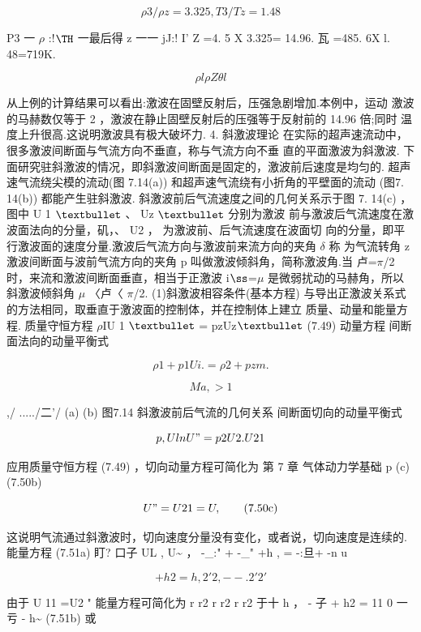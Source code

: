 \[\rho 3/\rho  z=3.325 ,  T3 /Tz = 1. 48\]

P3 一 $\rho$ :!${\rm Þ}$ 一最后得 z 一一 jJ:! I' Z =4. 5 X 3.325= 14.96. 瓦 =485. 6X l. 48=719K.

\[\rho l\rho Z \theta l\]

从上例的计算结果可以看出:激波在固壁反射后，压强急剧增加.本例中，运动 激波的马赫数仅等于 2 ，激波在静止固壁反射后的压强等于反射前的 14.96 倍;同时 温度上升很高.这说明激波具有极大破坏力. 4. 斜激波理论 在实际的超声速流动中，很多激波间断面与气流方向不垂直，称与气流方向不垂 直的平面激波为斜激波. 下面研究驻斜激波的情况，即斜激波间断面是固定的，激波前后速度是均匀的. 超声速气流绕尖模的流动(图 7.14(a)) 和超声速气流绕有小折角的平壁面的流动 (图7. 14(b)) 都能产生驻斜激波. 斜激波前后气流速度之间的几何关系示于图 7. 14(c) ，图中 U 1 ${\rm •}$ 、 Uz ${\rm •}$ 分别为激波 前与激波后气流速度在激波面法向的分量，矶，、 U2 ， 为激波前、后气流速度在波面切 向的分量，即平行激波面的速度分量.激波后气流方向与激波前来流方向的夹角 $\delta$ 称 为气流转角 z 激波间断面与波前气流方向的夹角 p 叫做激波倾斜角，简称激波角.当 卢=$\pi$/2 时，来流和激波间断面垂直，相当于正激波 i${\rm ß}$=$\mu$ 是微弱扰动的马赫角，所以 斜激波倾斜角 $\mu$ 〈卢〈 $\pi$/2. (1)斜激波相容条件(基本方程) 与导出正激波关系式的方法相同，取垂直于激波面的控制体，并在控制体上建立 质量、动量和能量方程. 质量守恒方程 $\rho$IU 1 ${\rm •}$ = pzUz${\rm •}$ (7.49) 动量方程 间断面法向的动量平衡式

\begin{equation*}\rho 1 +p1Ui. = \rho  2 +pzm.\tag{7.50a}\end{equation*}

\[Ma,>1\]

,/ ...../二'/ (a) (b) 图7.14 斜激波前后气流的几何关系 间断面切向的动量平衡式

\[p , Uln U" = p2 U2. U21\]

应用质量守恒方程 (7.49) ，切向动量方程可简化为 第 7 章 气体动力学基础 p (c) (7.50b)

\begin{equation*}U" = U21 = U,\tag{7.50c}\end{equation*}

这说明气流通过斜激波时，切向速度分量没有变化，或者说，切向速度是连续的. 能量方程 (7.51a) 盯? 口子 UL , U\textasciitilde{} ， -\_:" + -\_" +h , = -:旦+ -n u

\[+ h2 = h, 2 ' 2 ,--. 2 ' 2 '\]

由于 U 11 =U2 " 能量方程可简化为 r r2 r r2 r r2 于十 h ， - 子 + h2 = 11 0 一亏 - h\textasciitilde{} (7.51b) 或

